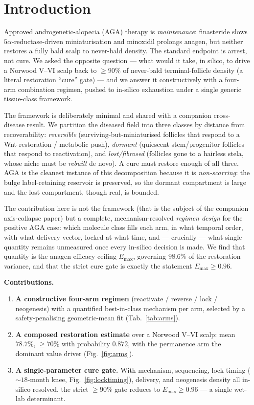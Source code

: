 \documentclass[11pt,a4paper]{article}
\begin{document}
\section{Introduction}
\label{sec:intro}
Approved androgenetic-alopecia (AGA) therapy is \emph{maintenance}: finasteride
slows $5\alpha$-reductase-driven miniaturisation and minoxidil prolongs anagen, but
neither restores a fully bald scalp to never-bald density. The standard endpoint is
arrest, not cure. We asked the opposite question --- what would it take, in silico,
to drive a Norwood V--VI scalp back to $\geq 90\%$ of never-bald terminal-follicle
density (a literal restoration ``cure'' gate) --- and we answer it constructively
with a four-arm combination regimen, pushed to in-silico exhaustion under a single
generic tissue-class framework.

The framework is deliberately minimal and shared with a companion cross-disease
result. We partition the diseased field into three classes by distance from
recoverability: \emph{reversible} (surviving-but-miniaturised follicles that respond
to a Wnt-restoration / metabolic push), \emph{dormant} (quiescent stem/progenitor
follicles that respond to reactivation), and \emph{lost/fibrosed} (follicles gone to
a hairless stela, whose niche must be \emph{rebuilt} de novo). A cure must restore
enough of all three. AGA is the cleanest instance of this decomposition because it is
\emph{non-scarring}: the bulge label-retaining reservoir \citep{cotsarelis1990} is
preserved, so the dormant compartment is large and the lost compartment, though
real, is bounded.

The contribution here is not the framework (that is the subject of the companion
axis-collapse paper) but a complete, mechanism-resolved \emph{regimen design} for the
positive AGA case: which molecule class fills each arm, in what temporal order, with
what delivery vector, locked at what time, and --- crucially --- what single quantity
remains unmeasured once every in-silico decision is made. We find that quantity is the
anagen efficacy ceiling $E_{\max}$, governing $98.6\%$ of the restoration variance, and
that the strict cure gate is exactly the statement $E_{\max}\!\geq\!0.96$.

\medskip\noindent\textbf{Contributions.}
\begin{enumerate}\itemsep0.3em
\item \textbf{A constructive four-arm regimen} (reactivate / reverse / lock /
neogenesis) with a quantified best-in-class mechanism per arm, selected by a
safety-penalising geometric-mean fit (Tab.~\ref{tab:arms}).
\item \textbf{A composed restoration estimate} over a Norwood V--VI scalp: mean
$78.7\%$, $\geq\!70\%$ with probability $0.872$, with the permanence arm the dominant
value driver (Fig.~\ref{fig:arms}).
\item \textbf{A single-parameter cure gate.} With mechanism, sequencing, lock-timing
($\sim\!18$-month knee, Fig.~\ref{fig:locktiming}), delivery, and neogenesis density
all in-silico resolved, the strict $\geq\!90\%$ gate reduces to $E_{\max}\!\geq\!0.96$
--- a single wet-lab determinant.
\end{enumerate}
\end{document}
